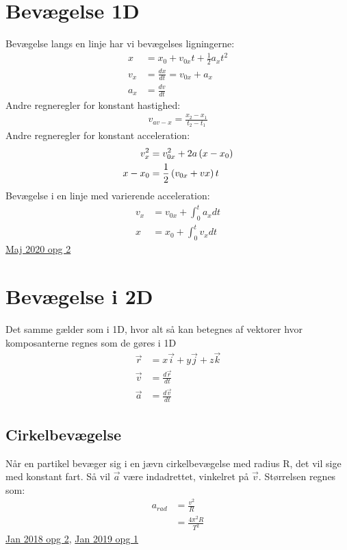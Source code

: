 \documentclass[a4paper,oneside,article]{memoir}
\begin{document}
\section{Bevægelse 1D}
Bevægelse langs en linje har vi bevægelses ligningerne: 
\begin{align*}
    x &= x_0+v_{0x}t+\frac{1}{2}a_xt^2 \\
    v_x &=\frac{dx}{dt}=v_{0x}+a_x \\
    a_x &= \frac{dv}{dt}
\end{align*}
Andre regneregler for konstant hastighed: 
\begin{align*}
    v_{av-x}=\frac{x_2-x_1}{t_2-t_1}
\end{align*}
Andre regneregler for konstant acceleration: 
\begin{align*}
    v_x^2 &= v_{0x}^2+2a\br{x-x_0} \\
    x-x_0 &= \frac{1}{2}\br{v_{0x}+vx}t
\end{align*}
Bevægelse i en linje med varierende acceleration: 
\begin{align*}
    v_x &= v_{0x}+\int_0^ta_xdt \\
    x &= x_0 + \int_0^tv_xdt
\end{align*}
\hyperref[asc:Maj 2020 opg 2]{Maj 2020 opg 2}

\section{Bevægelse i 2D}
Det samme gælder som i 1D, hvor alt så kan betegnes af vektorer hvor komposanterne regnes som de gøres i 1D
\begin{align*}
    \Vec{r} &= x\Vec{i}+y\Vec{j}+z\Vec{k} \\
    \Vec{v} &= \frac{d\Vec{r}}{dt} \\
    \Vec{a} &= \frac{d\Vec{v}}{dt}
\end{align*}

\subsection{Cirkelbevægelse}
Når en partikel bevæger sig i en jævn cirkelbevægelse med radius R, det vil sige med konstant fart. Så vil $\Vec{a}$ være indadrettet, vinkelret på $\Vec{v}$. Størrelsen regnes som: 
\begin{align*}
    a_{rad} &= \frac{v^2}{R} \\
    &= \frac{4\pi^2R}{T^2}
\end{align*}
\hyperref[asc:Jan 2018 opg 2]{Jan 2018 opg 2}, \hyperref[asc:Jan 2019 opg 1]{Jan 2019 opg 1}
\end{document}
